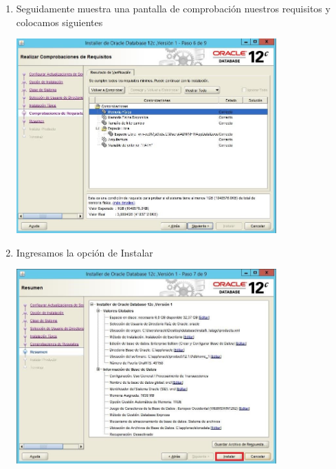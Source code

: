 \begin{enumerate}[1.]
	\hfill \break
	\hfill \break
	\hfill \break
	\hfill \break
	\hfill \break
	\hfill \break
	\hfill \break
	\hfill \break
	\item Seguidamente muestra una pantalla de comprobaci\'on nuestros requisitos y colocamos siguientes\\
	\begin{center}
	\includegraphics[width=10cm]{./Imagenes/mire4} 
	\end{center}

	\item Ingresamos la opci\'on de Instalar\\
	\begin{center}
	\includegraphics[width=10cm]{./Imagenes/mire5} 
	\end{center}


\end{enumerate}
